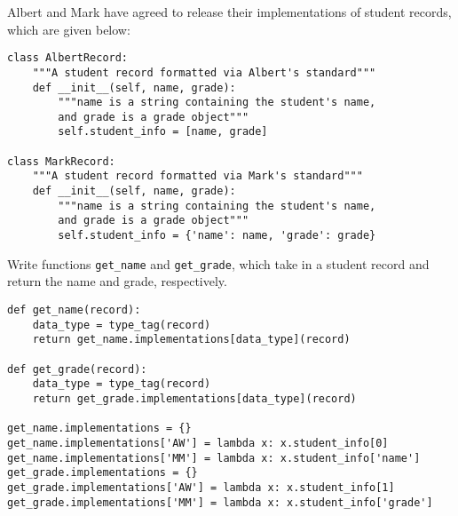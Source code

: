 \question Albert and Mark have agreed to release their implementations of student
records, which are given below:

\begin{lstlisting}
class AlbertRecord:
    """A student record formatted via Albert's standard"""
    def __init__(self, name, grade):
        """name is a string containing the student's name,
        and grade is a grade object"""
        self.student_info = [name, grade]

class MarkRecord:
    """A student record formatted via Mark's standard"""
    def __init__(self, name, grade):
        """name is a string containing the student's name,
        and grade is a grade object"""
        self.student_info = {'name': name, 'grade': grade}
\end{lstlisting}

Write functions {\tt get\_name} and {\tt get\_grade}, which take in a
student record and return the name and
grade, respectively.

\begin{solution}[2.5in]
\begin{lstlisting}
def get_name(record):
    data_type = type_tag(record)
    return get_name.implementations[data_type](record)

def get_grade(record):
    data_type = type_tag(record)
    return get_grade.implementations[data_type](record)

get_name.implementations = {}
get_name.implementations['AW'] = lambda x: x.student_info[0]
get_name.implementations['MM'] = lambda x: x.student_info['name']
get_grade.implementations = {}
get_grade.implementations['AW'] = lambda x: x.student_info[1]
get_grade.implementations['MM'] = lambda x: x.student_info['grade']
\end{lstlisting}
\end{solution}

